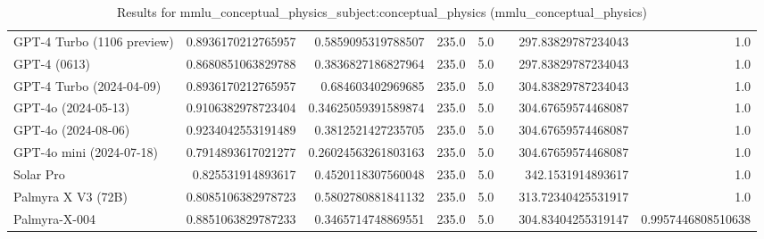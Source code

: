 \begin{table}[htp]
{\begin{tabular}{lrrrrrrr}
GPT-4 Turbo (1106 preview) & 0.8936170212765957 & 0.5859095319788507 & 235.0 & 5.0 &  & 297.83829787234043 & 1.0 \\
GPT-4 (0613) & 0.8680851063829788 & 0.3836827186827964 & 235.0 & 5.0 &  & 297.83829787234043 & 1.0 \\
GPT-4 Turbo (2024-04-09) & 0.8936170212765957 & 0.684603402969685 & 235.0 & 5.0 &  & 304.83829787234043 & 1.0 \\
GPT-4o (2024-05-13) & 0.9106382978723404 & 0.34625059391589874 & 235.0 & 5.0 &  & 304.67659574468087 & 1.0 \\
GPT-4o (2024-08-06) & 0.9234042553191489 & 0.3812521427235705 & 235.0 & 5.0 &  & 304.67659574468087 & 1.0 \\
GPT-4o mini (2024-07-18) & 0.7914893617021277 & 0.26024563261803163 & 235.0 & 5.0 &  & 304.67659574468087 & 1.0 \\
Solar Pro & 0.825531914893617 & 0.4520118307560048 & 235.0 & 5.0 &  & 342.1531914893617 & 1.0 \\
Palmyra X V3 (72B) & 0.8085106382978723 & 0.5802780881841132 & 235.0 & 5.0 &  & 313.72340425531917 & 1.0 \\
Palmyra-X-004 & 0.8851063829787233 & 0.3465714748869551 & 235.0 & 5.0 &  & 304.83404255319147 & 0.9957446808510638 \\
\bottomrule
\end{tabular}}
\caption{Results for mmlu_conceptual_physics_subject:conceptual_physics (mmlu_conceptual_physics)}
\label{fig:mmlu_conceptual_physics_subject:conceptual_physics (mmlu_conceptual_physics)}
\end{table}